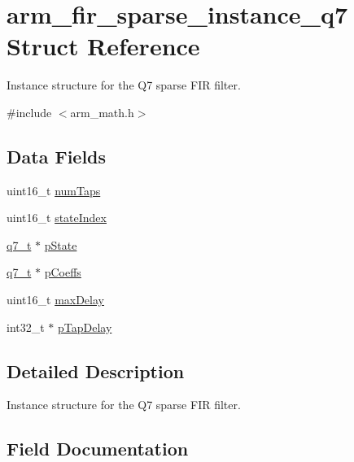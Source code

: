\hypertarget{structarm__fir__sparse__instance__q7}{}\section{arm\+\_\+fir\+\_\+sparse\+\_\+instance\+\_\+q7 Struct Reference}
\label{structarm__fir__sparse__instance__q7}


Instance structure for the Q7 sparse F\+IR filter.  




{\ttfamily \#include $<$arm\+\_\+math.\+h$>$}

\subsection*{Data Fields}
\begin{DoxyCompactItemize}
\item 
uint16\+\_\+t \mbox{\hyperlink{structarm__fir__sparse__instance__q7_a751941891e47f522a7f5375fe8990aac}{num\+Taps}}
\item 
uint16\+\_\+t \mbox{\hyperlink{structarm__fir__sparse__instance__q7_a566a0cb53437e48b9a3bf18e5b03d8aa}{state\+Index}}
\item 
\mbox{\hyperlink{arm__math_8h_ae541b6f232c305361e9b416fc9eed263}{q7\+\_\+t}} $\ast$ \mbox{\hyperlink{structarm__fir__sparse__instance__q7_aa8f67102521b620af6f259afdcf29785}{p\+State}}
\item 
\mbox{\hyperlink{arm__math_8h_ae541b6f232c305361e9b416fc9eed263}{q7\+\_\+t}} $\ast$ \mbox{\hyperlink{structarm__fir__sparse__instance__q7_a54407554b4fe7bbbb43924e4eea45e7f}{p\+Coeffs}}
\item 
uint16\+\_\+t \mbox{\hyperlink{structarm__fir__sparse__instance__q7_ab25f4ee7550e6d92acff77ada283733f}{max\+Delay}}
\item 
int32\+\_\+t $\ast$ \mbox{\hyperlink{structarm__fir__sparse__instance__q7_adec00b3793ab4f08edfeb4ea6a9eb6e6}{p\+Tap\+Delay}}
\end{DoxyCompactItemize}


\subsection{Detailed Description}
Instance structure for the Q7 sparse F\+IR filter. 

\subsection{Field Documentation}
\mbox{\label{structarm__fir__sparse__instance__q7_ab25f4ee7550e6d92acff77ada283733f}} 
